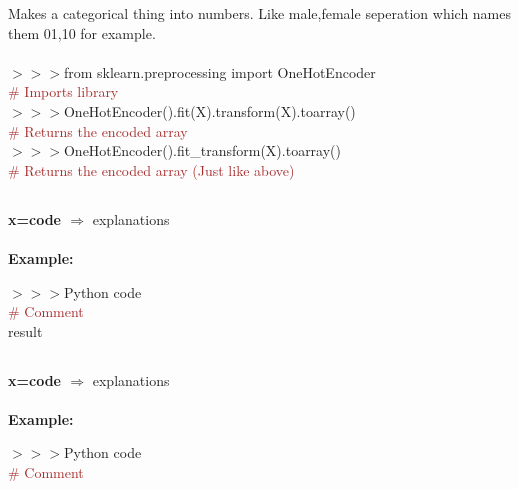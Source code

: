 \documentclass[a4paper,18pt]{article}
\begin{document}
Makes a categorical thing into numbers. Like male,female seperation which names them 01,10 for example.\\\\

$>>>$from sklearn.preprocessing import OneHotEncoder\\{\textcolor{brown}{\# Imports library}}\\

$>>>$OneHotEncoder().fit(X).transform(X).toarray()\\{\textcolor{brown}{\# Returns the encoded array}}\\

$>>>$OneHotEncoder().fit\_transform(X).toarray()\\{\textcolor{brown}{\# Returns the encoded array (Just like above)}}\\


\subsection{\colorbox {matgreen}{\color{white}{\large the code}}}
\textbf{x=code $\Rightarrow$} explanations\\\\
\textbf{Example:\\}

$>>>$Python code\\{\textcolor{brown}{\# Comment}}\\

\hspace{14pt} result\\


\subsection{\colorbox {matgreen}{\color{white}{\large the code}}}
\textbf{x=code $\Rightarrow$} explanations\\\\
\textbf{Example:\\}

$>>>$Python code\\{\textcolor{brown}{\# Comment}}\\
\end{document}

